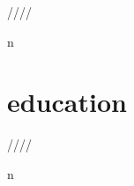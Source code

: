 \documentclass[]{fancy-cv}
\begin{document}
\vspace{-0.5em}
\begin{entrylist}
 \year/\degree/\school/\city/\subtitle in \positions {
  \entry{\year}{\degree}{\school}{\subtitle}
}
\end{entrylist}

\vspace{-1.75em}
\section{education}
\label{sec:education}

\vspace{-0.5em}
\begin{entrylist}
 \year/\degree/\school/\city/\subtitle in \education {
  \entry{\year}{\degree}{\school}{\subtitle}
}
\end{entrylist}

\clearpage
\end{document}
